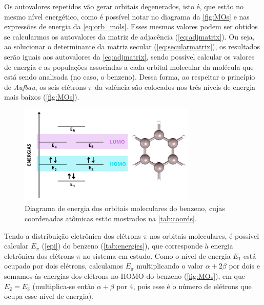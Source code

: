 Os autovalores repetidos vão gerar orbitais degenerados, isto é, que estão no mesmo nível energético, como é possível notar no diagrama da \autoref{fig:MOs} e nas expressões de energia da \autoref{eq:orb_mols}. Esses mesmos valores podem ser obtidos se calcularmos os autovalores da matriz de adjacência (\autoref{eq:adjmatrix}). Ou seja, ao solucionar o determinante da matriz secular (\autoref{eq:secularmatrix}), os resultados serão iguais aos autovalores da \autoref{eq:adjmatrix}, sendo possível calcular os valores de energia e as populações associadas a cada orbital molecular da molécula que está sendo analisada (no caso, o benzeno). Dessa forma, ao respeitar o princípio de \textit{Aufbau}, os seis elétrons $\pi$ da valência são colocados nos três níveis de energia mais baixos (\autoref{fig:MOs}).

\begin{figure}[htb]
\caption{\label{fig:MOs} Diagrama de energia dos orbitais moleculares do benzeno, cujas coordenadas atômicas estão mostrados na \autoref{tab:coords}.}
	\begin{center}
		\includegraphics[width=0.75\textwidth]{images/MOs.png}
	\end{center}
\end{figure}

Tendo a distribuição eletrônica dos elétrons $\pi$ nos orbitais moleculares, é possível calcular $E_\pi$ (\autoref{epi}) do benzeno (\autoref{tab:energies}), que corresponde à energia eletrônica dos elétrons $\pi$ no sistema em estudo. Como o nível de energia $E_1$ está ocupado por dois elétrons, calculamos $E_\pi$ multiplicando o valor $\alpha + 2 \beta$ por dois e somamos às energias dos elétrons no \gls{HOMO} do benzeno (\autoref{fig:MOs}), em que $E_2 = E_3$ (multiplica-se então $\alpha + \beta$ por 4, pois esse é o número de elétrons que ocupa esse nível de energia).


